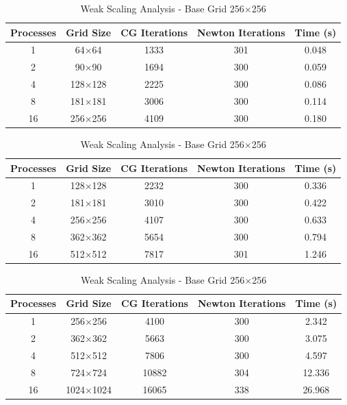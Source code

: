 \documentclass[unicode,11pt,a4paper,oneside,numbers=endperiod,openany]{scrartcl}
\begin{document}
\begin{table}[!ht]
  \centering
  
  \caption{Weak Scaling Analysis - Base Grid 64×64}
  \begin{tabular}{ccccc}
  \hline
  Processes & Grid Size & CG Iterations & Newton Iterations & Time (s) \\
  \hline
  1 & 64×64 & 1333 & 301 & 0.048 \\
  2 & 90×90 & 1694 & 300 & 0.059 \\
  4 & 128×128 & 2225 & 300 & 0.086 \\
  8 & 181×181 & 3006 & 300 & 0.114 \\
  16 & 256×256 & 4109 & 300 & 0.180 \\
  \hline
  \end{tabular}
  
  \vspace{1em}
  
  \caption{Weak Scaling Analysis - Base Grid 128×128}
  \begin{tabular}{ccccc}
  \hline
  Processes & Grid Size & CG Iterations & Newton Iterations & Time (s) \\
  \hline
  1 & 128×128 & 2232 & 300 & 0.336 \\
  2 & 181×181 & 3010 & 300 & 0.422 \\
  4 & 256×256 & 4107 & 300 & 0.633 \\
  8 & 362×362 & 5654 & 300 & 0.794 \\
  16 & 512×512 & 7817 & 301 & 1.246 \\
  \hline
  \end{tabular}
  
  \vspace{1em}
  
  \caption{Weak Scaling Analysis - Base Grid 256×256}
  \begin{tabular}{ccccc}
  \hline
  Processes & Grid Size & CG Iterations & Newton Iterations & Time (s) \\
  \hline
  1 & 256×256 & 4100 & 300 & 2.342 \\
  2 & 362×362 & 5663 & 300 & 3.075 \\
  4 & 512×512 & 7806 & 300 & 4.597 \\
  8 & 724×724 & 10882 & 304 & 12.336 \\
  16 & 1024×1024 & 16065 & 338 & 26.968 \\
  \hline
  \end{tabular}
  
  \end{table}
\end{document}
